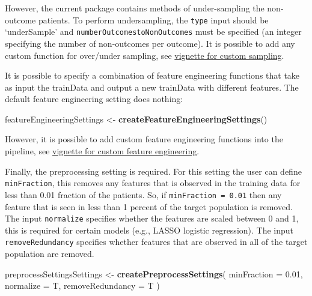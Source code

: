 \documentclass[
]{article}
\newenvironment{Shaded}{\begin{snugshade}}{\end{snugshade}}
\newcommand{\AttributeTok}[1]{\textcolor[rgb]{0.13,0.29,0.53}{#1}}
\newcommand{\FloatTok}[1]{\textcolor[rgb]{0.00,0.00,0.81}{#1}}
\newcommand{\FunctionTok}[1]{\textcolor[rgb]{0.13,0.29,0.53}{\textbf{#1}}}
\newcommand{\NormalTok}[1]{#1}
\newcommand{\OtherTok}[1]{\textcolor[rgb]{0.56,0.35,0.01}{#1}}
\begin{document}
However, the current package contains methods of under-sampling the
non-outcome patients. To perform undersampling, the \texttt{type} input
should be `underSample' and \texttt{numberOutcomestoNonOutcomes} must be
specified (an integer specifying the number of non-outcomes per
outcome). It is possible to add any custom function for over/under
sampling, see
\href{https://github.com/OHDSI/PatientLevelPrediction/blob/master/inst/doc/AddingCustomSamples.pdf}{vignette
for custom sampling}.

It is possible to specify a combination of feature engineering functions
that take as input the trainData and output a new trainData with
different features. The default feature engineering setting does
nothing:

\begin{Shaded}
\begin{Highlighting}[]
\NormalTok{  featureEngineeringSettings }\OtherTok{\textless{}{-}} \FunctionTok{createFeatureEngineeringSettings}\NormalTok{()}
\end{Highlighting}
\end{Shaded}

However, it is possible to add custom feature engineering functions into
the pipeline, see
\href{https://github.com/OHDSI/PatientLevelPrediction/blob/master/inst/doc/AddingCustomFeatureEngineering.pdf}{vignette
for custom feature engineering}.

Finally, the preprocessing setting is required. For this setting the
user can define \texttt{minFraction}, this removes any features that is
observed in the training data for less than 0.01 fraction of the
patients. So, if \texttt{minFraction\ =\ 0.01} then any feature that is
seen in less than 1 percent of the target population is removed. The
input \texttt{normalize} specifies whether the features are scaled
between 0 and 1, this is required for certain models (e.g., LASSO
logistic regression). The input \texttt{removeRedundancy} specifies
whether features that are observed in all of the target population are
removed.

\begin{Shaded}
\begin{Highlighting}[]
\NormalTok{  preprocessSettingsSettings }\OtherTok{\textless{}{-}} \FunctionTok{createPreprocessSettings}\NormalTok{(}
    \AttributeTok{minFraction =} \FloatTok{0.01}\NormalTok{, }
    \AttributeTok{normalize =}\NormalTok{ T, }
    \AttributeTok{removeRedundancy =}\NormalTok{ T}
\NormalTok{      )}
\end{Highlighting}
\end{Shaded}
\end{document}
